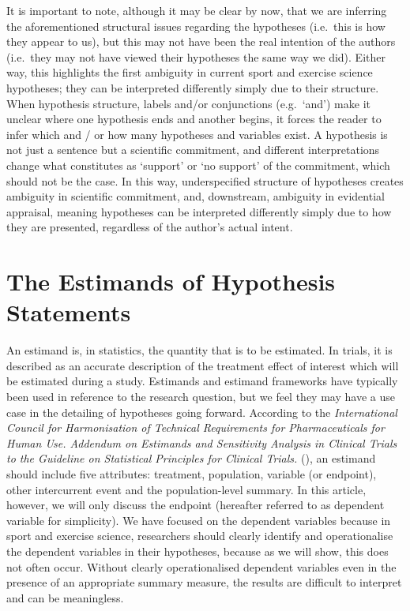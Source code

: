 \documentclass[
]{article}
\begin{document}
It is important to note, although it may be clear by now, that we are
inferring the aforementioned structural issues regarding the hypotheses
(i.e.~this is how they appear to us), but this may not have been the
real intention of the authors (i.e.~they may not have viewed their
hypotheses the same way we did). Either way, this highlights the first
ambiguity in current sport and exercise science hypotheses; they can be
interpreted differently simply due to their structure. When hypothesis
structure, labels and/or conjunctions (e.g.~`and') make it unclear where
one hypothesis ends and another begins, it forces the reader to infer
which and / or how many hypotheses and variables exist. A hypothesis is
not just a sentence but a scientific commitment, and different
interpretations change what constitutes as `support' or `no support' of
the commitment, which should not be the case. In this way,
underspecified structure of hypotheses creates ambiguity in scientific
commitment, and, downstream, ambiguity in evidential appraisal, meaning
hypotheses can be interpreted differently simply due to how they are
presented, regardless of the author's actual intent.

\section{The Estimands of Hypothesis
Statements}\label{the-estimands-of-hypothesis-statements}

An estimand is, in statistics, the quantity that is to be estimated. In
trials, it is described as an accurate description of the treatment
effect of interest which will be estimated during a study. Estimands and
estimand frameworks have typically been used in reference to the
research question, but we feel they may have a use case in the detailing
of hypotheses going forward. According to the \emph{International
Council for Harmonisation of Technical Requirements for Pharmaceuticals
for Human Use. Addendum on Estimands and Sensitivity Analysis in
Clinical Trials to the Guideline on Statistical Principles for Clinical
Trials.} (), an estimand should include
five attributes: treatment, population, variable (or endpoint), other
intercurrent event and the population-level summary. In this article,
however, we will only discuss the endpoint (hereafter referred to as
dependent variable for simplicity). We have focused on the dependent
variables because in sport and exercise science, researchers should
clearly identify and operationalise the dependent variables in their
hypotheses, because as we will show, this does not often occur. Without
clearly operationalised dependent variables even in the presence of an
appropriate summary measure, the results are difficult to interpret and
can be meaningless.
\end{document}
